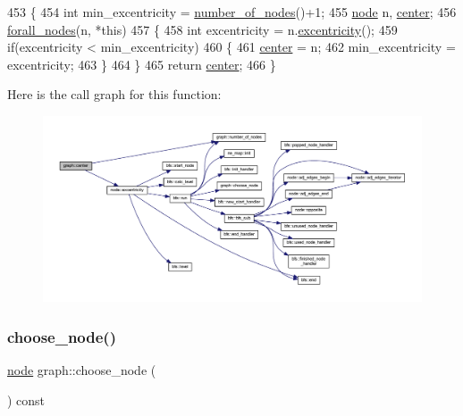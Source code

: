 \begin{DoxyCode}
453 \{
454     \textcolor{keywordtype}{int} min\_excentricity = \mbox{\hyperlink{classgraph_a42c78e0a9f115655e3ff0efe35ebfc4e}{number\_of\_nodes}}()+1;
455     \mbox{\hyperlink{classnode}{node}} n, \mbox{\hyperlink{classgraph_a351617e023b4b6833ab650a70fc086e7}{center}};
456     \mbox{\hyperlink{graph_8h_a1905bf4c6aa7167b9ee5a2e72f12ad2d}{forall\_nodes}}(n, *\textcolor{keyword}{this}) 
457     \{
458     \textcolor{keywordtype}{int} excentricity = n.\mbox{\hyperlink{classnode_aba6b3a48e7b951f08ebbbf3275f0ce9a}{excentricity}}();
459     \textcolor{keywordflow}{if}(excentricity < min\_excentricity) 
460     \{
461         \mbox{\hyperlink{classgraph_a351617e023b4b6833ab650a70fc086e7}{center}} = n;
462         min\_excentricity = excentricity;
463     \}
464     \}
465     \textcolor{keywordflow}{return} \mbox{\hyperlink{classgraph_a351617e023b4b6833ab650a70fc086e7}{center}};
466 \}
\end{DoxyCode}
Here is the call graph for this function\+:\nopagebreak
\begin{figure}[H]
\begin{center}
\leavevmode
\includegraphics[width=350pt]{classgraph_a351617e023b4b6833ab650a70fc086e7_cgraph}
\end{center}
\end{figure}
\mbox{\label{classgraph_aec5c11c90a94ebd145f059a541db860e}} 
\subsubsection{\texorpdfstring{choose\+\_\+node()}{choose\_node()}}
{\footnotesize\ttfamily \mbox{\hyperlink{classnode}{node}} graph\+::choose\+\_\+node (\begin{DoxyParamCaption}{ }\end{DoxyParamCaption}) const\hspace{0.3cm}{\ttfamily [inherited]}}

